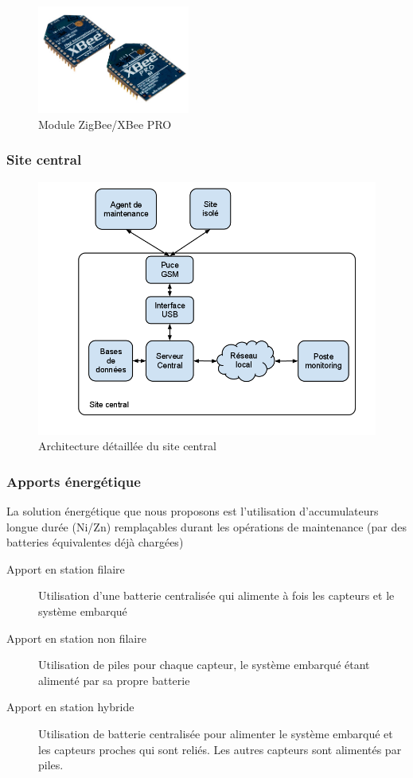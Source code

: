 \documentclass{mise_en_page}
\begin{document}
\begin{figure}[H]
	\centering
	\includegraphics[width=50mm]{zigbee.png}
	\caption{Module ZigBee/XBee PRO}
\end{figure}

\subsubsection{Site central}

\begin{figure}[H]
	\centering
	\includegraphics[width=150mm]{site_central.png}
	\caption{Architecture détaillée du site central}
\end{figure}

\subsubsection{Apports énergétique}

La solution énergétique que nous proposons est l'utilisation d'accumulateurs longue durée (Ni/Zn) remplaçables durant les opérations de maintenance (par des batteries équivalentes déjà chargées)

\begin{description}
	\item[Apport en station filaire]
		Utilisation d'une batterie centralisée qui alimente à fois les capteurs et le système embarqué
	\item[Apport en station non filaire]
		Utilisation de piles pour chaque capteur, le système embarqué étant alimenté par sa propre batterie
	\item[Apport en station hybride]
		Utilisation de batterie centralisée pour alimenter le système embarqué et les capteurs proches qui sont reliés. Les autres capteurs sont alimentés par piles.
\end{description}
\end{document}
